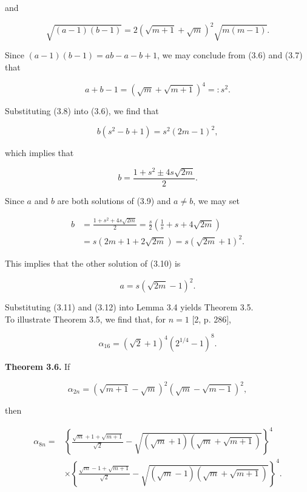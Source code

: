 \documentclass[11pt,letterpaper]{article}
\begin{document}
and


\begin{equation*}
\sqrt{(a-1)(b-1)}=2(\sqrt{m+1}+\sqrt{m})^{2} \sqrt{m(m-1)} . \tag{3.7}\label{eq:3.7}
\end{equation*}


Since $(a-1)(b-1)=a b-a-b+1$, we may conclude from (3.6) and (3.7) that


\begin{equation*}
a+b-1=(\sqrt{m}+\sqrt{m+1})^{4}=: s^{2} . \tag{3.8}\label{eq:3.8}
\end{equation*}


Substituting (3.8) into (3.6), we find that


\begin{equation*}
b\left(s^{2}-b+1\right)=s^{2}(2 m-1)^{2}, \tag{3.9}\label{eq:3.9}
\end{equation*}


which implies that


\begin{equation*}
b=\frac{1+s^{2} \pm 4 s \sqrt{2 m}}{2} . \tag{3.10}\label{eq:3.10}
\end{equation*}


Since $a$ and $b$ are both solutions of (3.9) and $a \neq b$, we may set


\begin{align*}
b & =\frac{1+s^{2}+4 s \sqrt{2 m}}{2}=\frac{s}{2}\left(\frac{1}{s}+s+4 \sqrt{2 m}\right)  \tag{3.11}\label{eq:3.11}\\
& =s(2 m+1+2 \sqrt{2 m})=s(\sqrt{2 m}+1)^{2} .
\end{align*}


This implies that the other solution of (3.10) is


\begin{equation*}
a=s(\sqrt{2 m}-1)^{2} . \tag{3.12}\label{eq:3.12}
\end{equation*}


Substituting (3.11) and (3.12) into Lemma 3.4 yields Theorem 3.5.\\
To illustrate Theorem 3.5, we find that, for $n=1$ [2, p. 286],

\[
\alpha_{16}=(\sqrt{2}+1)^{4}\left(2^{1 / 4}-1\right)^{8} .
\]

\noindent\textbf{Theorem 3.6.} If

\[
\alpha_{2 n}=(\sqrt{m+1}-\sqrt{m})^{2}(\sqrt{m}-\sqrt{m-1})^{2},
\]

then

\[
\begin{aligned}
\alpha_{8 n}= & \left\{\frac{\sqrt{m}+1+\sqrt{m+1}}{\sqrt{2}}-\sqrt{(\sqrt{m}+1)(\sqrt{m}+\sqrt{m+1})}\right\}^{4} \\
& \times\left\{\frac{\sqrt{m}-1+\sqrt{m+1}}{\sqrt{2}}-\sqrt{(\sqrt{m}-1)(\sqrt{m}+\sqrt{m+1})}\right\}^{4} .
\end{aligned}
\]
\end{document}
